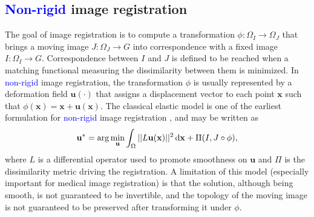 \subsection{\textcolor{blue}{Non-rigid} image registration}\label{sec:non_linear_image_registration}
The goal of image registration is to compute a transformation $\phi: \Omega_{I} \rightarrow \Omega_{J}$ that brings a moving image $J:\Omega_{J} \rightarrow G$ into correspondence
with a fixed image $I:\Omega_{I} \rightarrow G$. Correspondence between $I$ and $J$ is defined to be reached when a matching functional measuring the dissimilarity between them is minimized. In \textcolor{blue}{non-rigid} image registration, the transformation $\phi$ is usually represented by a deformation field $\mathbf{u(\cdot)}$ that assigns a displacement vector
to each point $\mathbf{x}$ such that $\phi(\mathbf{x}) = \mathbf{x} + \mathbf{u}(\mathbf{x})$. The classical elastic model is one of the earliest formulation for \textcolor{blue}{non-rigid} image registration \cite{Bajcsy1982, Gee1999}, and may be written as
\begin{equation}\label{eq:elastic}
    \mathbf{u}^{*} = \arg \min_{\mathbf{u}} \int_{\Omega} ||L \mathbf{u}(\mathbf{x})||^{2}\dif\mathbf{x} + \Pi(I, J \circ \phi),
\end{equation}
where $L$ is a differential operator used to promote smoothness on $\mathbf{u}$ and $\Pi$ is the dissimilarity metric driving the registration. A limitation of this model (especially important for medical image registration) is that the solution, although being smooth, is not guaranteed to be invertible, and the topology of the moving image is not guaranteed to be preserved after transforming it under $\phi$.\\

